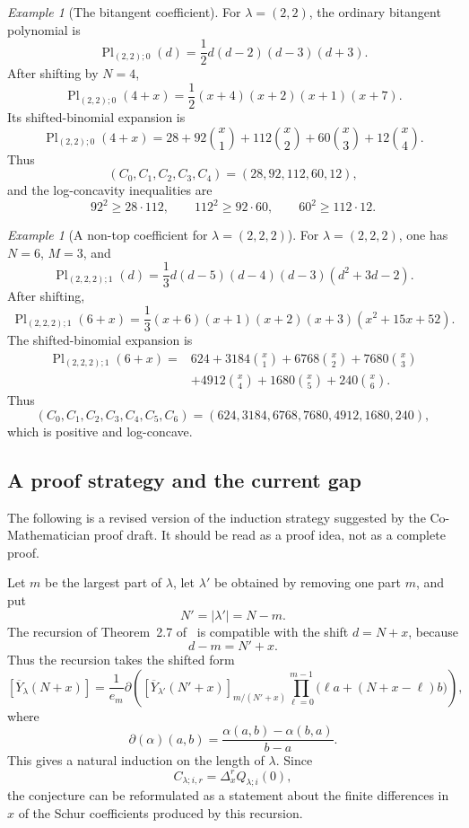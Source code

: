 \documentclass[11pt]{amsart}
\numberwithin{equation}{section}
\theoremstyle{remark}
\newtheorem{example}[theorem]{Example}
\begin{document}
\begin{example}[The bitangent coefficient]
For $\lambda=(2,2)$, the ordinary bitangent polynomial is
\[
  \operatorname{Pl}_{(2,2);0}(d)
  =
  \frac12 d(d-2)(d-3)(d+3).
\]
After shifting by $N=4$,
\[
  \operatorname{Pl}_{(2,2);0}(4+x)
  =
  \frac12(x+4)(x+2)(x+1)(x+7).
\]
Its shifted-binomial expansion is
\[
  \operatorname{Pl}_{(2,2);0}(4+x)
  =
  28
  +92\binom x1
  +112\binom x2
  +60\binom x3
  +12\binom x4.
\]
Thus
\[
  (C_0,C_1,C_2,C_3,C_4)
  =
  (28,92,112,60,12),
\]
and the log-concavity inequalities are
\[
  92^2\ge 28\cdot112,\qquad
  112^2\ge 92\cdot60,\qquad
  60^2\ge 112\cdot12.
\]
\end{example}

\begin{example}[A non-top coefficient for $\lambda=(2,2,2)$]
For $\lambda=(2,2,2)$, one has $N=6$, $M=3$, and
\[
  \operatorname{Pl}_{(2,2,2);1}(d)
  =
  \frac13 d(d-5)(d-4)(d-3)(d^2+3d-2).
\]
After shifting,
\[
  \operatorname{Pl}_{(2,2,2);1}(6+x)
  =
  \frac13(x+6)(x+1)(x+2)(x+3)(x^2+15x+52).
\]
The shifted-binomial expansion is
\[
\begin{aligned}
  \operatorname{Pl}_{(2,2,2);1}(6+x)
  ={}&
  624
  +3184\binom x1
  +6768\binom x2
  +7680\binom x3  \\
  &+4912\binom x4
  +1680\binom x5
  +240\binom x6.
\end{aligned}
\]
Thus
\[
  (C_0,C_1,C_2,C_3,C_4,C_5,C_6)
  =
  (624,3184,6768,7680,4912,1680,240),
\]
which is positive and log-concave.
\end{example}

\subsection{A proof strategy and the current gap}

The following is a revised version of the induction strategy suggested by
the Co-Mathematician proof draft.  It should be read as a proof idea, not
as a complete proof.

Let $m$ be the largest part of $\lambda$, let $\lambda'$ be obtained
by removing one part $m$, and put
\[
  N'=|\lambda'|=N-m.
\]
The recursion of Theorem~2.7 of~\cite{feher2023plucker} is compatible
with the shift $d=N+x$, because
\[
  d-m=N'+x.
\]
Thus the recursion takes the shifted form
\[
  [\overline Y_\lambda(N+x)]
  =
  \frac1{e_m}
  \partial
  \left(
    [\overline Y_{\lambda'}(N'+x)]_{m/(N'+x)}
    \prod_{\ell=0}^{m-1}\bigl(\ell a+(N+x-\ell)b\bigr)
  \right),
\]
where
\[
  \partial(\alpha)(a,b)
  =
  \frac{\alpha(a,b)-\alpha(b,a)}{b-a}.
\]
This gives a natural induction on the length of $\lambda$.  Since
\[
  C_{\lambda;i,r}
  =
  \Delta_x^r Q_{\lambda;i}(0),
\]
the conjecture can be reformulated as a statement about the finite
differences in $x$ of the Schur coefficients produced by this recursion.
\end{document}
